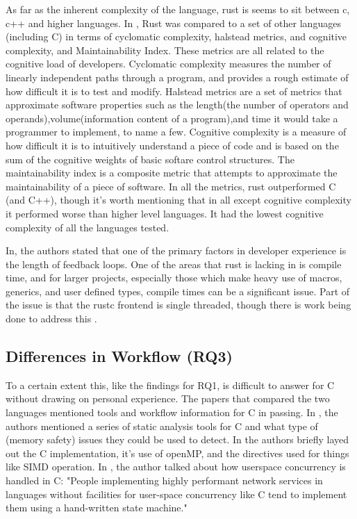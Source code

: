 \documentclass[conference]{IEEEtran}
\begin{document}

{
    As far as the inherent complexity of the language, rust is seems to sit between c, c++ and higher languages. In \cite{arditoEvaluationRustCode2021}, Rust was compared to a set of other languages (including C) in terms of cyclomatic complexity, halstead metrics, and cognitive complexity, and Maintainability Index. These metrics are all related to the cognitive load of developers. Cyclomatic complexity measures the number of linearly independent paths through a program, and provides a rough estimate of how difficult it is to test and modify. Halstead metrics are a set of metrics that approximate software properties such as the length(the number of operators and operands),volume(information content of a program),and time it would take a programmer to implement, to name a few. Cognitive complexity is a measure of how difficult it is to intuitively understand a piece of code and is based on the sum of the cognitive weights of basic softare control structures. The maintainability index is a composite metric that attempts to approximate the maintainability of a piece of software. In all the metrics, rust outperformed C (and C++), though it's worth mentioning that in all except cognitive complexity it performed worse than higher level languages. It had the lowest cognitive complexity of all the languages tested.
}

{
    In\cite{nodaDevExWhatActually2023}, the authors stated that one of the primary factors in developer experience is
    the length of feedback loops. One of the areas that rust is lacking in is compile time, and for larger projects, especially those
    which make heavy use of macros, generics, and user defined types, compile times can be a significant issue. Part of the issue is that
    the rustc frontend is single threaded, though there is work being done to address this \cite{TrackingIssueParallel}.
}

\subsection{Differences in Workflow (RQ3)}
{
    To a certain extent this, like the findings for RQ1, is difficult to answer for C without drawing on personal experience. The papers that
    compared the two languages mentioned tools and workflow information for C in passing. In \cite{nosedaRustSecureIoT2022},
    the authors mentioned a series of static analysis tools for C and what type of (memory safety) issues they could be
    used to detect. In \cite{costanzoPerformanceVsProgramming2021} the authors briefly layed out the C implementation, it's use
    of openMP, and the directives used for things like SIMD operation. In \cite{saoirseWhyAsyncRust2023}, the author talked about how userspace
    concurrency is handled in C: "People implementing highly performant network services in languages without facilities for user-space
    concurrency like C tend to implement them using a hand-written state machine."
}
\end{document}
